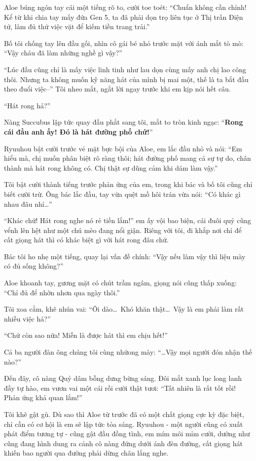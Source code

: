\documentclass[../main.tex]{subfiles}
\begin{document}
Aloe búng ngón tay cái một tiếng rõ to, cười toe toét: ``Chuẩn không cần chỉnh! Kể từ khi chia tay mấy đứa Gen 5, ta đã phải dọn trọ liên tục ở Thị trấn Điện tử, làm đủ thứ việc vặt để kiếm tiền trang trải.''

Bố tôi chống tay lên đầu gối, nhìn cô gái bé nhỏ trước mặt với ánh mắt tò mò: ``Vậy cháu đã làm những nghề gì vậy?''

``Lúc đầu cũng chỉ là mấy việc linh tinh như lau dọn cùng mấy anh chị lao công thôi. Nhưng ta không muốn kỹ năng hát của mình bị mai một, thế là ta bắt đầu theo đuổi việc--'' Tôi nheo mắt, ngắt lời ngay trước khi em kịp nói hết câu.

``Hát rong hả?''

Nàng Succubus lập tức quay đầu phắt sang tôi, mắt to tròn kinh ngạc: ``\textbf{Rong cái đầu anh ấy! Đó là hát đường phố chứ!}''

Ryuuhou bật cười trước vẻ mặt bực bội của Aloe, em lắc đầu nhỏ và nói: ``Em hiểu mà, chị muốn phân biệt rõ ràng thôi; hát đường phố mang cả sự tự do, chân thành mà hát rong không có. Chị thật sự dũng cảm khi dám làm vậy.''

Tôi bật cười thành tiếng trước phản ứng của em, trong khi bác và bố tôi cũng chỉ biết cười trừ. Ông bác lắc đầu, tay vừa quệt mồ hôi trán vừa nói: ``Có khác gì nhau đâu nhỉ\dots''

``Khác chứ! Hát rong nghe nó rẻ tiền lắm!'' em ấy vội bao biện, cái đuôi quỷ cũng vểnh lên hệt như một chú mèo đang nổi giận. Riêng với tôi, đi khắp nơi chỉ để cất giọng hát thì có khác biệt gì với hát rong đâu chứ.

Bác tôi ho nhẹ một tiếng, quay lại vấn đề chính: ``Vậy nếu làm vậy thì liệu mày có đủ sống không?''

Aloe khoanh tay, gương mặt có chút trầm ngâm, giọng nói cũng thấp xuống: ``Chỉ đủ để nhờn nhơn qua ngày thôi.''

Tôi xoa cằm, khẽ nhún vai: ``Ôi dào\dots\ Khó khăn thật\dots\ Vậy là em phải làm rất nhiều việc hả?''

``Chứ còn sao nữa! Miễn là được hát thì em chịu hết!''

Cả ba người đàn ông chúng tôi cùng nhứong mày: ``\dots Vậy mọi người đón nhận thế nào?''

Đến đây, cô nàng Quỷ dâm bỗng dưng bừng sáng. Đôi mắt xanh lục long lanh đầy tự hào, em vươn vai một cái rồi cười thật tươi: ``Tất nhiên là rất tốt rồi! Phản ứng khả quan lắm!''

Tôi khẽ gật gù. Dù sao thì Aloe từ trước đã có một chất giọng cực kỳ đặc biệt, chỉ cần có cơ hội là em sẽ lập tức tỏa sáng. Ryuuhou - một người cũng có xuất phát điểm tương tự - cũng gật đầu đồng tình, em mím môi mỉm cười, dường như cũng đang hình dung ra cảnh cô nàng đứng dưới ánh đèn đường, cất giọng hát khiến bao người qua đường phải dừng chân lắng nghe.
\end{document}
